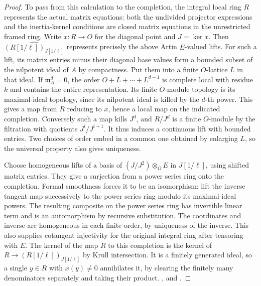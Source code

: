 \begin{proof}
To pass from this calculation to the completion, the integral local
ring \(R\) represents the actual matrix equations: both the
undivided projector expressions and the inertia-kernel conditions
are closed matrix equations in the unrestricted framed ring.
Write \(x:R\to O\) for the diagonal point and \(J=\ker x\).
Then \(\widehat{(R[1/\ell])_{J[1/\ell]}}\) represents precisely the
above Artin \(E\)-valued lifts. For such a lift, its matrix entries
minus their diagonal base values form a bounded subset of the
nilpotent ideal of \(A\) by compactness. Put them into a finite
\(O\)-lattice \(L\) in that ideal. If \(\mathfrak m_A^d=0\), the
order \(O+L+\cdots+L^{d-1}\) is complete local with residue \(k\)
and contains the entire representation. Its finite \(O\)-module
topology is its maximal-ideal topology, since its nilpotent ideal
is killed by the \(d\)-th power. This gives a map from \(R\)
reducing to \(x\), hence a local map on the indicated completion.
Conversely such a map kills \(J^d\), and \(R/J^d\) is a finite
\(O\)-module by the filtration with quotients \(J^i/J^{i+1}\).
It thus induces a continuous lift with bounded entries. Two
choices of order embed in a common one obtained by enlarging \(L\),
so the universal property also gives uniqueness.

Choose homogeneous lifts of a basis of \( (J/J^2)\otimes_O E\)
in \(J[1/\ell]\), using shifted matrix entries. They give a
surjection from a power series ring onto the completion. Formal
smoothness forces it to be an isomorphism: lift the inverse tangent
map successively to the power series ring modulo its maximal-ideal
powers. The resulting composite on the power series ring has
invertible linear term and is an automorphism by recursive
substitution. The coordinates and inverse are homogeneous in each
finite order, by uniqueness of the inverse. This also supplies
cotangent injectivity for the original integral ring after tensoring
with \(E\). The kernel of the map \(R\) to this completion is the
kernel of \(R\to(R[1/\ell])_{J[1/\ell]}\) by Krull intersection.
It is a finitely generated ideal, so a single \(y\in R\) with
\(x(y)\ne0\) annihilates it, by clearing the finitely many
denominators separately and taking their product.
,
and .
\end{proof}

